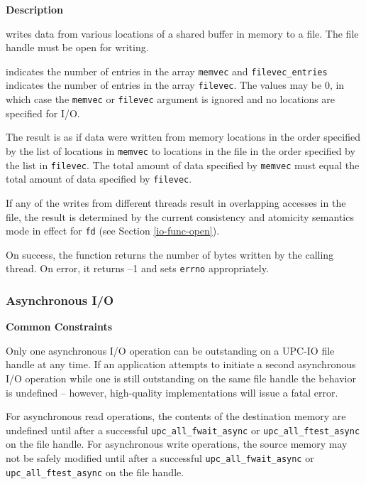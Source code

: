 {\bf Description}

 writes data from various locations of a
shared buffer in memory to a file. The file handle must be open for writing.

 indicates the number of entries in the array {\tt memvec} and
{\tt filevec\_entries} indicates the number of entries in the array {\tt filevec}. The
values may be 0, in which case the {\tt memvec} or {\tt filevec} argument is ignored and
no locations are specified for I/O.

\np The result is as if data were written from memory locations in the order
specified by the list of locations in {\tt memvec} to locations in the file in the
order specified by the list in {\tt filevec}. The total amount of data specified
by {\tt memvec} must equal the total amount of data specified by {\tt filevec}.

\np If any of the writes from different threads result in overlapping accesses
in the file, the result is determined by the current consistency and atomicity
semantics mode in effect for {\tt fd} (see Section \ref{io-func-open}).

\np On success, the function returns the number of bytes written by the
calling thread. On error, it returns --1 and sets {\tt errno} appropriately.

\subsubsection{Asynchronous I/O}

{\bf Common Constraints}

\npf Only one asynchronous I/O operation can be outstanding on a UPC-IO file
handle at any time. If an application attempts to initiate a second
asynchronous I/O operation while one is still outstanding on the same file
handle the behavior is undefined -- however, high-quality implementations will
issue a fatal error.

\np For asynchronous read operations, the contents of the destination memory
are undefined until after a successful {\tt upc\_all\_fwait\_async} or \linebreak
{\tt upc\_all\_ftest\_async} on the file handle. For asynchronous write operations,
the source memory may not be safely modified until after a successful
{\tt upc\_all\_fwait\_async} or {\tt upc\_all\_ftest\_async} on the file handle.

